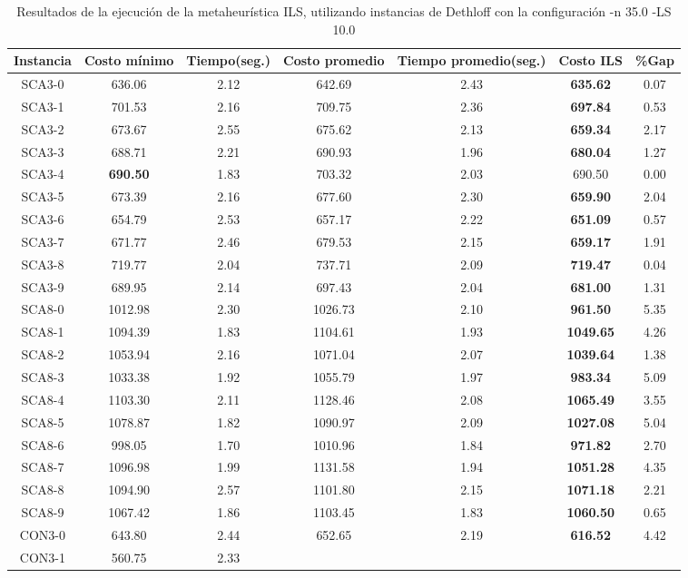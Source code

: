 \begin{table}[ht]
\caption{Resultados de la ejecución de la metaheurística ILS, utilizando instancias de Dethloff con la configuración -n 35.0 -LS 10.0}
\centering
\small
\begin{tabular}{c c c c c c c}
\hline\hline
Instancia & Costo mínimo & Tiempo(seg.) & Costo promedio & Tiempo promedio(seg.) & Costo ILS & \%Gap \\ [0.5ex]
\hline
SCA3-0 & 636.06 & 2.12 & 
642.69 & 2.43 & \bf{635.62} & 
0.07\\SCA3-1 & 701.53 & 2.16 & 
709.75 & 2.36 & \bf{697.84} & 
0.53\\SCA3-2 & 673.67 & 2.55 & 
675.62 & 2.13 & \bf{659.34} & 
2.17\\SCA3-3 & 688.71 & 2.21 & 
690.93 & 1.96 & \bf{680.04} & 
1.27\\SCA3-4 & \bf{690.50} & 1.83 & 
703.32 & 2.03 & 690.50 & 0.00\\
SCA3-5 & 673.39 & 2.16 & 
677.60 & 2.30 & \bf{659.90} & 
2.04\\SCA3-6 & 654.79 & 2.53 & 
657.17 & 2.22 & \bf{651.09} & 
0.57\\SCA3-7 & 671.77 & 2.46 & 
679.53 & 2.15 & \bf{659.17} & 
1.91\\SCA3-8 & 719.77 & 2.04 & 
737.71 & 2.09 & \bf{719.47} & 
0.04\\SCA3-9 & 689.95 & 2.14 & 
697.43 & 2.04 & \bf{681.00} & 
1.31\\SCA8-0 & 1012.98 & 2.30 & 
1026.73 & 2.10 & \bf{961.50} & 
5.35\\SCA8-1 & 1094.39 & 1.83 & 
1104.61 & 1.93 & \bf{1049.65} & 
4.26\\SCA8-2 & 1053.94 & 2.16 & 
1071.04 & 2.07 & \bf{1039.64} & 
1.38\\SCA8-3 & 1033.38 & 1.92 & 
1055.79 & 1.97 & \bf{983.34} & 
5.09\\SCA8-4 & 1103.30 & 2.11 & 
1128.46 & 2.08 & \bf{1065.49} & 
3.55\\SCA8-5 & 1078.87 & 1.82 & 
1090.97 & 2.09 & \bf{1027.08} & 
5.04\\SCA8-6 & 998.05 & 1.70 & 
1010.96 & 1.84 & \bf{971.82} & 
2.70\\SCA8-7 & 1096.98 & 1.99 & 
1131.58 & 1.94 & \bf{1051.28} & 
4.35\\SCA8-8 & 1094.90 & 2.57 & 
1101.80 & 2.15 & \bf{1071.18} & 
2.21\\SCA8-9 & 1067.42 & 1.86 & 
1103.45 & 1.83 & \bf{1060.50} & 
0.65\\CON3-0 & 643.80 & 2.44 & 
652.65 & 2.19 & \bf{616.52} & 
4.42\\CON3-1 & 560.75 & 2.33 & 

\end{tabular}
\end{table}
